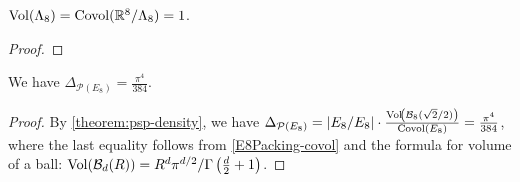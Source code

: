\begin{lemma}\label{E8Packing-covol}
  $\operatorname{Vol}\!\left(\Lambda_8\right) = \mathrm{Covol}(\mathbb{R}^8 / \Lambda_8) = 1$.
\end{lemma}
\begin{proof}
\end{proof}

\begin{theorem}\label{E8Packing-density}
  We have $\Delta_{\mathcal{P}(E_8)} = \frac{\pi^4}{384}$.
\end{theorem}
\begin{proof}
  By \cref{theorem:psp-density}, we have $\Delta_{\mathcal{P}(E_8)} = |E_8 / E_8| \cdot \frac{\operatorname{Vol}\!\left(\mathcal{B}_8(\sqrt{2} / 2)\right)}{\mathrm{Covol}(E_8)} = \frac{\pi^4}{384}$, where the last equality follows from \cref{E8Packing-covol} and the formula for volume of a ball: $\operatorname{Vol}\!\left(\mathcal{B}_d(R)\right) = R^d \pi^{d / 2} / \Gamma\left(\frac{d}{2} + 1\right)$.
\end{proof}
